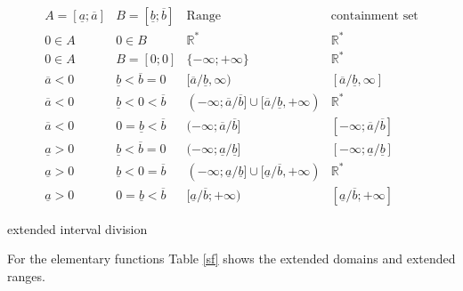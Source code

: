 \documentclass{report}
\newcommand{\R}{\mathbb{R}}
\begin{document}
\begin{center}
\begin{table}[!]
\[
\begin{array}{llll}
\hline
A=[\underline{a};\overline{a}]&B=[\underline{b};\overline{b}]&
\textrm{Range}&\textrm{containment set}\\
\hline
0\in A&0\in B&\R^\ast&\R^\ast\\
0\in
A&B=[0;0]&\{-\infty;+\infty\}&\R^\ast\\
\overline{a}<0&\underline{b}<\overline{b}=0&[\overline{a}/\underline{b},\infty)&[\overline{a}/\underline{b},\infty]\\
\overline{a}<0&\underline{b}<0<\overline{b}&(-\infty;\overline{a}/\overline{b}]\cup[\overline{a}/\underline{b},+\infty)&\R^\ast\\
\overline{a}<0&0=\underline{b}<\overline{b}&(-\infty;\overline{a}/\overline{b}]&[-\infty;\overline{a}/\overline{b}]\\
\underline{a}>0&\underline{b}<\overline{b}=0&(-\infty;\underline{a}/\underline{b}]&[-\infty;\underline{a}/\underline{b}]\\
\underline{a}>0&\underline{b}<0=\overline{b}&(-\infty;\underline{a}/\underline{b}]\cup[\underline{a}/\overline{b},+\infty)&\R^\ast\\
\underline{a}>0&0=\underline{b}<\overline{b}&[\underline{a}/\overline{b};+\infty)&[\underline{a}/\overline{b};+\infty]
\end{array}
\]
\caption{\label{idiv}extended interval division}
\end{table}
\end{center}




For the elementary functions Table \ref{sf} shows the extended
domains and extended ranges.
\end{document}
